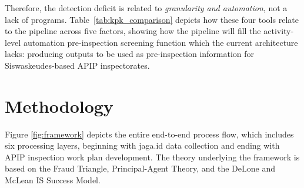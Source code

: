 \documentclass[3p,times,procedia]{elsarticle}
\begin{document}
Therefore, the detection deficit is related to \textit{granularity and automation}, not a lack of programs. Table~\ref{tab:kpk_comparison} depicts how these four tools relate to the pipeline across five factors, showing how the pipeline will fill the activity-level automation pre-inspection screening function which the current architecture lacks: producing outputs to be used as pre-inspection information for Siswaskeudes-based APIP inspectorates.



\section{Methodology}
\label{sec:method}

Figure \ref{fig:framework} depicts the entire end-to-end process flow, which includes six processing layers, beginning with jaga.id data collection and ending with APIP inspection work plan development. The theory underlying the framework is based on the Fraud Triangle, Principal-Agent Theory, and the DeLone and McLean IS Success Model.
\end{document}
